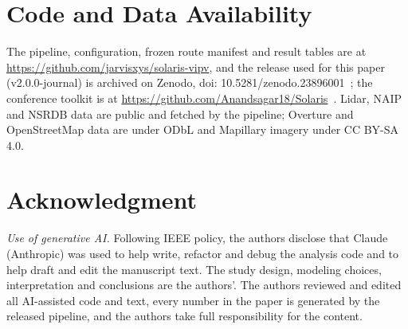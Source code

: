 \documentclass[lettersize,journal]{IEEEtran}
\begin{document}
\section*{Code and Data Availability}
The pipeline, configuration, frozen route manifest and result tables are at \url{https://github.com/jarvisxys/solaris-vipv}, and the release used for this paper (v2.0.0-journal) is archived on Zenodo, doi: 10.5281/zenodo.23896001~\cite{ref_zenodo}; the conference toolkit is at \url{https://github.com/Anandsagar18/Solaris}~\cite{ref_code}. Lidar, NAIP and NSRDB data are public and fetched by the pipeline; Overture and OpenStreetMap data are under ODbL and Mapillary imagery under CC BY-SA 4.0.

\section*{Acknowledgment}
\emph{Use of generative AI.} Following IEEE policy, the authors disclose that Claude (Anthropic) was used to help write, refactor and debug the analysis code and to help draft and edit the manuscript text. The study design, modeling choices, interpretation and conclusions are the authors'. The authors reviewed and edited all AI-assisted code and text, every number in the paper is generated by the released pipeline, and the authors take full responsibility for the content.
\end{document}
